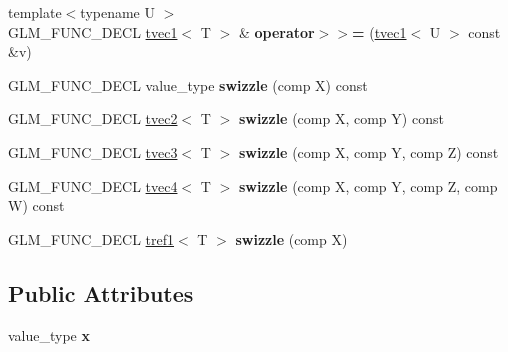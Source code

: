 \begin{DoxyCompactItemize}
\item 
\hypertarget{structglm_1_1detail_1_1tvec1_a7ba6e4f5cf271ca16bc8353edca3dc5e}{{\footnotesize template$<$typename U $>$ }\\\-G\-L\-M\-\_\-\-F\-U\-N\-C\-\_\-\-D\-E\-C\-L \hyperlink{structglm_1_1detail_1_1tvec1}{tvec1}$<$ \-T $>$ \& {\bfseries operator$>$$>$=} (\hyperlink{structglm_1_1detail_1_1tvec1}{tvec1}$<$ \-U $>$ const \&v)}\label{structglm_1_1detail_1_1tvec1_a7ba6e4f5cf271ca16bc8353edca3dc5e}

\item 
\hypertarget{structglm_1_1detail_1_1tvec1_ab258e2d7ca9feea296fdba45aa08506f}{\-G\-L\-M\-\_\-\-F\-U\-N\-C\-\_\-\-D\-E\-C\-L value\-\_\-type {\bfseries swizzle} (comp \-X) const }\label{structglm_1_1detail_1_1tvec1_ab258e2d7ca9feea296fdba45aa08506f}

\item 
\hypertarget{structglm_1_1detail_1_1tvec1_a5e7f3cadec820ede79ba60558fd997f0}{\-G\-L\-M\-\_\-\-F\-U\-N\-C\-\_\-\-D\-E\-C\-L \hyperlink{structglm_1_1detail_1_1tvec2}{tvec2}$<$ \-T $>$ {\bfseries swizzle} (comp \-X, comp \-Y) const }\label{structglm_1_1detail_1_1tvec1_a5e7f3cadec820ede79ba60558fd997f0}

\item 
\hypertarget{structglm_1_1detail_1_1tvec1_ac2fe43138ea25472a08647229124b1d1}{\-G\-L\-M\-\_\-\-F\-U\-N\-C\-\_\-\-D\-E\-C\-L \hyperlink{structglm_1_1detail_1_1tvec3}{tvec3}$<$ \-T $>$ {\bfseries swizzle} (comp \-X, comp \-Y, comp \-Z) const }\label{structglm_1_1detail_1_1tvec1_ac2fe43138ea25472a08647229124b1d1}

\item 
\hypertarget{structglm_1_1detail_1_1tvec1_a2543087488c26f83e20b92b55977e0fb}{\-G\-L\-M\-\_\-\-F\-U\-N\-C\-\_\-\-D\-E\-C\-L \hyperlink{structglm_1_1detail_1_1tvec4}{tvec4}$<$ \-T $>$ {\bfseries swizzle} (comp \-X, comp \-Y, comp \-Z, comp \-W) const }\label{structglm_1_1detail_1_1tvec1_a2543087488c26f83e20b92b55977e0fb}

\item 
\hypertarget{structglm_1_1detail_1_1tvec1_a6237f003a2637aa33f6912f83ca80e20}{\-G\-L\-M\-\_\-\-F\-U\-N\-C\-\_\-\-D\-E\-C\-L \hyperlink{structglm_1_1detail_1_1tref1}{tref1}$<$ \-T $>$ {\bfseries swizzle} (comp \-X)}\label{structglm_1_1detail_1_1tvec1_a6237f003a2637aa33f6912f83ca80e20}

\end{DoxyCompactItemize}
\subsection*{\-Public \-Attributes}
\begin{DoxyCompactItemize}
\item 
\hypertarget{structglm_1_1detail_1_1tvec1_a0c881ef566673e7fb8e6e6703695a461}{value\-\_\-type {\bfseries x}}\label{structglm_1_1detail_1_1tvec1_a0c881ef566673e7fb8e6e6703695a461}

\end{DoxyCompactItemize}
